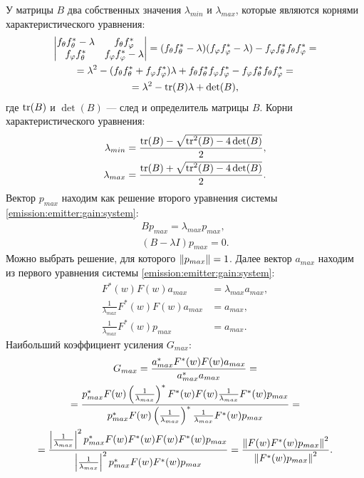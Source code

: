 У матрицы $B$ два собственных значения $\lambda_{min}$ и $\lambda_{max}$, которые являются корнями характеристического уравнения:
\begin{multline*}
    \begin{vmatrix}
        f_\theta f_\theta^* - \lambda & f_{\theta} f_\varphi^*          \\
        f_\varphi f_\theta^*          & f_\varphi f_\varphi^* - \lambda
    \end{vmatrix}
    = (f_\theta f_\theta^* - \lambda) (f_\varphi f_\varphi^* - \lambda) - f_\varphi f_\theta^* f_{\theta} f_\varphi^* = \\
    = \lambda^2 - ( f_\theta f_\theta^* + f_\varphi f_\varphi^* ) \lambda + f_\theta f_\theta^* f_\varphi f_\varphi^* - f_\varphi f_\theta^* f_{\theta} f_\varphi^* = \\
    = \lambda^2 - \operatorname{tr}(B) \lambda + \det(B) ,
\end{multline*}
где $\operatorname{tr}(B)$ и $\det(B)$ --- след и определитель матрицы $B$. Корни характеристического уравнения:
\begin{align}
    \lambda_{min} & = \frac{\operatorname{tr}(B) - \sqrt{\operatorname{tr}^2(B) - 4 \det(B)}}{2} \label{emission:emitter:gain:minimum_eigenvalue} , \\
    \lambda_{max} & = \frac{\operatorname{tr}(B) + \sqrt{\operatorname{tr}^2(B) - 4 \det(B)}}{2} \label{emission:emitter:gain:maximum_eigenvalue}.
\end{align}
Вектор $p_{max}$ находим как решение второго уравнения системы \eqref{emission:emitter:gain:system}:
\begin{gather*}
    B p_{max} = \lambda_{max} p_{max} , \\
    ( B - \lambda I ) p_{max} = 0 .
\end{gather*}
Можно выбрать решение, для которого $\left \| p_{max} \right \| = 1$. Далее вектор $a_{max}$ находим из первого уравнения системы \eqref{emission:emitter:gain:system}:
\begin{align*}
    F^*(w) F(w) a_{max}                         & = \lambda_{max} a_{max} , \\
    \frac{1}{\lambda_{max}} F^*(w) F(w) a_{max} & = a_{max} , \\
    \frac{1}{\lambda_{max}} F^*(w) p_{max}            & = a_{max} .
\end{align*}
Наибольший коэффициент усиления $G_{max}$:
\begin{multline*}
    G_{max}
    = \frac{a_{max}^* F^*(w) F(w) a_{max}}{a_{max}^* a_{max}} = \\
    = \frac{p_{max}^* F(w) \left ( \frac{1}{\lambda_{max}} \right )^* F^*(w) F(w) \frac{1}{\lambda_{max}} F^*(w) p_{max}}{ p_{max}^* F(w) \left ( \frac{1}{\lambda_{max}} \right )^* \frac{1}{\lambda_{max}} F^*(w) p_{max}} = \\
    = \frac{\left | \frac{1}{\lambda_{max}} \right |^2 p_{max}^* F(w) F^*(w) F(w) F^*(w) p_{max}}{ \left | \frac{1}{\lambda_{max}} \right |^2 p_{max}^* F(w) F^*(w) p_{max}}
    = \frac{\left \| F(w) F^*(w) p_{max} \right \|^2}{ \left \| F^*(w) p_{max} \right \|^2} .
\end{multline*}


